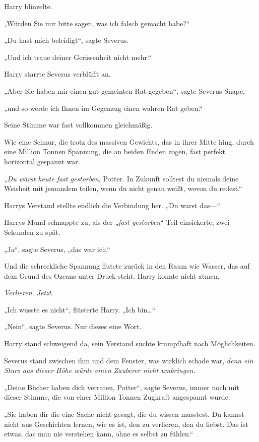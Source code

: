 {Harry blinzelte.

„Würden Sie mir bitte sagen, was ich falsch gemacht habe?“

„Du hast mich beleidigt“, sagte Severus.

„Und ich traue deiner Gerissenheit nicht mehr.“

Harry starrte Severus verblüfft an.

„Aber Sie haben mir einen gut gemeinten Rat gegeben“, sagte Severus Snape,

„und so werde ich Ihnen im Gegenzug einen wahren Rat geben.“

Seine Stimme war fast vollkommen gleichmäßig.

Wie eine Schnur, die trotz des massiven Gewichts, das in ihrer Mitte hing, durch eine Million Tonnen Spannung, die an beiden Enden zogen, fast perfekt horizontal gespannt war.

„\emph{Du wärst heute fast gestorben}, Potter. In Zukunft solltest du niemals deine Weisheit mit jemandem teilen, wenn du nicht genau weißt, wovon du redest.“

Harrys Verstand stellte endlich die Verbindung her. „Du warst das—“

Harrys Mund schnappte zu, als der „\emph{fast gestorben}“-Teil einsickerte, zwei Sekunden zu spät.

„Ja“, sagte Severus, „das war ich.“

Und die schreckliche Spannung flutete zurück in den Raum wie Wasser, das auf dem Grund des Ozeans unter Druck steht. Harry konnte nicht atmen.

\emph{Verlieren. Jetzt}.

„Ich wusste es nicht“, flüsterte Harry. „Ich bin…“

„Nein“, sagte Severus. Nur dieses eine Wort.

Harry stand schweigend da, sein Verstand suchte krampfhaft nach Möglichkeiten.

Severus stand zwischen ihm und dem Fenster, was wirklich schade war, \emph{denn ein Sturz aus dieser Höhe würde einen Zauberer nicht umbringen.}

„Deine Bücher haben dich verraten, Potter“, sagte Severus, immer noch mit dieser Stimme, die von einer Million Tonnen Zugkraft angespannt wurde.

„Sie haben dir die eine Sache nicht gesagt, die du wissen musstest. Du kannst nicht aus Geschichten lernen, wie es ist, den zu verlieren, den du liebst. Das ist etwas, das man nie verstehen kann, ohne es selbst zu fühlen.“

}
